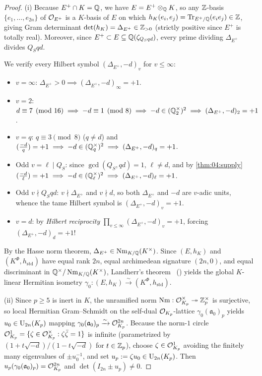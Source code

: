 \begin{proof}
(i) Because $E^+ \cap K = \mathbb{Q}$, we have $E = E^+ \otimes_{\mathbb{Q}} K$, so any $\mathbb{Z}$-basis $\{e_1, \dots, e_{2n}\}$ of $\mathcal{O}_{E^+}$ is a $K$-basis of $E$ on which $h_K(e_i, e_j) = \operatorname{Tr}_{E^+/\mathbb{Q}}(e_i e_j) \in \mathbb{Z}$, giving Gram determinant $\det(h_K) = \Delta_{E^+} \in \mathbb{Z}_{>0}$ (strictly positive since $E^+$ is totally real). Moreover, since $E^+ \subset E \subseteq \mathbb{Q}(\zeta_{Q_S q d})$, every prime dividing $\Delta_{E^+}$ divides $Q_S q d$.

We verify every Hilbert symbol $(\Delta_{E^+}, -d)_v$ for $v \le \infty$:
\begin{itemize}
\item $v = \infty$: $\Delta_{E^+} > 0 \implies (\Delta_{E^+}, -d)_\infty = +1$.
\item $v = 2$: $d \equiv 7 \pmod{16} \implies -d \equiv 1 \pmod 8 \implies -d \in (\mathbb{Q}_2^\times)^2 \implies (\Delta_{E^+}, -d)_2 = +1$.
\item $v = q$: $q \equiv 3 \pmod 8$ ($q \neq d$) and $(\frac{-d}{q}) = +1 \implies -d \in (\mathbb{Q}_q^\times)^2 \implies (\Delta_{E^+}, -d)_q = +1$.
\item Odd $v = \ell \mid Q_S$: since $\gcd(Q_S, qd) = 1$, $\ell \neq d$, and by \cref{thm:04:supply} $(\frac{-d}{\ell}) = +1 \implies -d \in (\mathbb{Q}_\ell^\times)^2 \implies (\Delta_{E^+}, -d)_\ell = +1$.
\item Odd $v \nmid Q_S q d$: $v \nmid \Delta_{E^+}$ and $v \nmid d$, so both $\Delta_{E^+}$ and $-d$ are $v$-adic units, whence the tame Hilbert symbol is $(\Delta_{E^+}, -d)_v = +1$.
\item $v = d$: by \emph{Hilbert reciprocity} $\prod_{v \le \infty} (\Delta_{E^+}, -d)_v = +1$, forcing $(\Delta_{E^+}, -d)_d = +1$!
\end{itemize}
By the Hasse norm theorem, $\Delta_{E^+} \in \operatorname{Nm}_{K/\mathbb{Q}}(K^\times)$. Since $(E, h_K)$ and $(K^\Phi, h_{\mathrm{std}})$ have equal rank $2n$, equal archimedean signature $(2n, 0)$, and equal discriminant in $\mathbb{Q}^\times / \operatorname{Nm}_{K/\mathbb{Q}}(K^\times)$, Landherr's theorem~\cite{Landherr1936} (\cite[Chapter~10, Theorem~6.9]{Scharlau1985}) yields the global $K$-linear Hermitian isometry $\gamma_0 : (E, h_K) \xrightarrow{\sim} (K^\Phi, h_{\mathrm{std}})$.

(ii) Since $p \ge 5$ is inert in $K$, the unramified norm $\operatorname{Nm} : \mathcal{O}_{K_p}^\times \twoheadrightarrow \mathbb{Z}_p^\times$ is surjective, so local Hermitian Gram--Schmidt on the self-dual $\mathcal{O}_{K_p}$-lattice $\gamma_0(\mathfrak{a}_0)_p$ yields $u_0 \in \mathrm{U}_{2n}(K_p)$ mapping $\gamma_0(\mathfrak{a}_0)_p \xrightarrow{\sim} \mathcal{O}_{K_p}^{2n}$. Because the norm-$1$ circle $\mathcal{O}_{K_p}^1 = \{\zeta \in \mathcal{O}_{K_p}^\times : \zeta\bar{\zeta} = 1\}$ is infinite (parametrized by $(1 + t\sqrt{-d})/(1 - t\sqrt{-d})$ for $t \in \mathbb{Z}_p$), choose $\zeta \in \mathcal{O}_{K_p}^1$ avoiding the finitely many eigenvalues of $\pm u_0^{-1}$, and set $u_p := \zeta u_0 \in \mathrm{U}_{2n}(K_p)$. Then $u_p(\gamma_0(\mathfrak{a}_0)_p) = \mathcal{O}_{K_p}^{2n}$ and $\det(I_{2n} \pm u_p) \neq 0$.


\end{proof}
